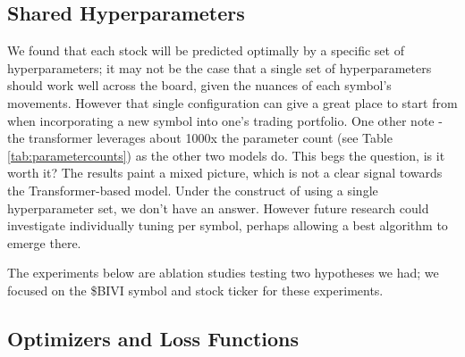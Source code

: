 \documentclass[10pt,twocolumn,letterpaper]{article}
\begin{document}
\begin{table}
\begin{center}
\end{center}
\caption{Test Set Class Distribution by Symbol}
\label{tab:testclassdistribution}
\end{table}


\subsection{Shared Hyperparameters}

We found that each stock will be predicted optimally by a specific set of hyperparameters; it may not be the case that a single set of hyperparameters should work well across the board, given the nuances of each symbol’s movements. However that single configuration can give a great place to start from when incorporating a new symbol into one’s trading portfolio.
One other note - the transformer leverages about 1000x the parameter count (see Table \ref{tab:parametercounts}) as the other two models do. This begs the question, is it worth it? The results paint a mixed picture, which is not a clear signal towards the Transformer-based model. Under the construct of using a single hyperparameter set, we don’t have an answer. However future research could investigate individually tuning per symbol, perhaps allowing a best algorithm to emerge there.

The experiments below are ablation studies testing two hypotheses we had; we focused on the \$BIVI symbol and stock ticker for these experiments.

\subsection{Optimizers and Loss Functions}
\end{document}
